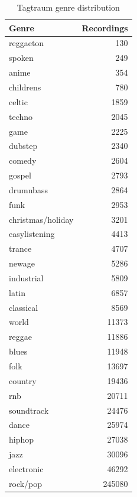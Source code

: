 \begin{table}[!htb]
    \centering
    \begin{tabular}{l r} 
        \hline
        Genre & Recordings \\ [0.5ex] 
        \hline
        reggaeton & 130 \\
        spoken & 249 \\
        anime & 354 \\
        childrens & 780 \\
        celtic & 1859 \\
        techno & 2045 \\
        game & 2225 \\
        dubstep & 2340 \\
        comedy & 2604 \\
        gospel & 2793 \\
        drumnbass & 2864 \\
        funk & 2953 \\
        christmas/holiday & 3201 \\
        easylistening & 4413 \\
        trance & 4707 \\
        newage & 5286 \\
        industrial & 5809 \\
        latin & 6857 \\
        classical & 8569 \\
        world & 11373 \\
        reggae & 11886 \\
        blues & 11948 \\
        folk & 13697 \\
        country & 19436 \\
        rnb & 20711 \\
        soundtrack & 24476 \\
        dance & 25974 \\
        hiphop & 27038 \\
        jazz & 30096 \\
        electronic & 46292 \\
        rock/pop & 245080 \\
        \hline
    \end{tabular}
    \caption{Tagtraum genre distribution}
    \label{table:tagtraumdist}
\end{table}



